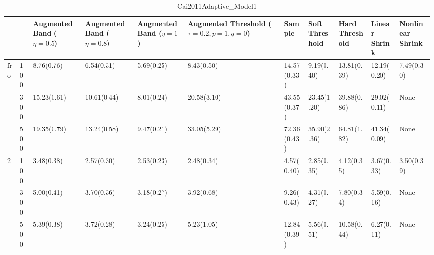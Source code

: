 \begin{table}[htbp]
\centering
\caption{Cai2011Adaptive_Model1}
\label{my label}
\begin{tabular}{ll|p{2cm}p{2cm}p{2cm}p{2cm}p{2cm}p{2cm}p{2cm}p{2cm}p{2cm}}
\toprule
  &     & Augmented Band ($\eta=0.5$) & Augmented Band ($\eta=0.8$) & Augmented Band ($\eta=1$) & Augmented Threshold ($\tau=0.2, p=1, q=0$) &       Sample & Soft Threshold & Hard Threshold & Linear Shrink & Nonlinear Shrink \\
\midrule
fro & 100 &                  8.76(0.76) &                  6.54(0.31) &                5.69(0.25) &                                 8.43(0.50) &  14.57(0.33) &     9.19(0.40) &    13.81(0.39) &   12.19(0.20) &       7.49(0.30) \\
  & 300 &                 15.23(0.61) &                 10.61(0.44) &                8.01(0.24) &                                20.58(3.10) &  43.55(0.37) &    23.45(1.20) &    39.88(0.86) &   29.02(0.11) &             None \\
  & 500 &                 19.35(0.79) &                 13.24(0.58) &                9.47(0.21) &                                33.05(5.29) &  72.36(0.43) &    35.90(2.36) &    64.81(1.82) &   41.34(0.09) &             None \\
2 & 100 &                  3.48(0.38) &                  2.57(0.30) &                2.53(0.23) &                                 2.48(0.34) &   4.57(0.40) &     2.85(0.35) &     4.12(0.35) &    3.67(0.33) &       3.50(0.39) \\
  & 300 &                  5.00(0.41) &                  3.70(0.36) &                3.18(0.27) &                                 3.92(0.68) &   9.26(0.43) &     4.31(0.27) &     7.80(0.34) &    5.59(0.16) &             None \\
  & 500 &                  5.39(0.38) &                  3.72(0.28) &                3.24(0.25) &                                 5.23(1.05) &  12.84(0.39) &     5.56(0.51) &    10.58(0.44) &    6.27(0.11) &             None \\
\bottomrule
\end{tabular}
\end{table}
